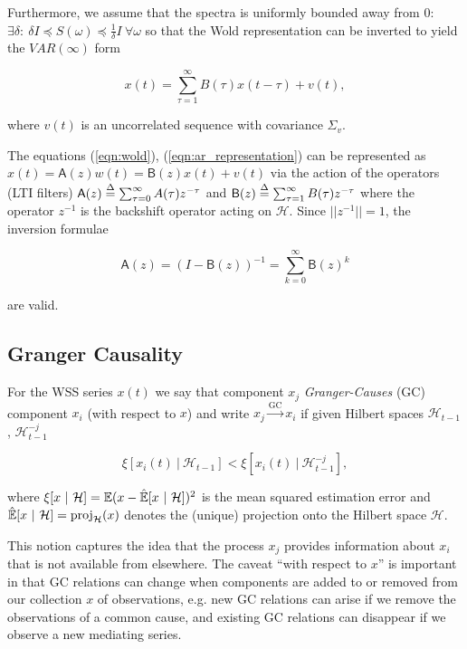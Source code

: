 \documentclass[12pt]{article}
\def\gc{\overset{\text{GC}}{\rightarrow}}  %
\def\B{\mathsf{B}}  %
\def\A{\mathsf{A}}  %
\def\H{\mathcal{H}}  %
\newcommand{\linE}[2]{\hat{\E}[#1\ |\ #2]}  %
\newcommand{\linEerr}[2]{\xi[#1\ |\ #2]}  %
\begin{document}
Furthermore, we assume that the spectra is uniformly bounded away from
$0$:
$\exists \delta:\ \delta I \preceq S(\omega) \preceq \frac{1}{\delta}
I\ \forall \omega$ so that the Wold representation can be inverted to
yield the $VAR(\infty)$ form

\begin{equation}
  \label{eqn:ar_representation}
  x(t) = \sum_{\tau = 1}^\infty B(\tau) x(t - \tau) + v(t),
\end{equation}

where $v(t)$ is an uncorrelated sequence with covariance $\Sigma_v$.

The equations (\ref{eqn:wold}), (\ref{eqn:ar_representation}) can be
represented as $x(t) = \A(z)w(t) = \B(z)x(t) + v(t)$ via the action of
the operators (LTI filters)
$\A(z) \defeq \sum_{\tau = 0}^\infty A(\tau)z^{-\tau}$ and
$\B(z) \defeq \sum_{\tau = 1}^\infty B(\tau)z^{-\tau}$ where the
operator $z^{-1}$ is the backshift operator acting on $\H$.  Since
$||z^{-1}|| = 1$, the inversion formulae

\begin{equation}
  \label{eqn:lsi_inversion}
  \A(z) = (I - \B(z))^{-1} = \sum_{k = 0}^\infty \B(z)^k
\end{equation}

are valid.
\subsection{Granger Causality}

\begin{definition}
  For the WSS series $x(t)$ we say that component $x_j$
  \textit{Granger-Causes} (GC) component $x_i$ (with respect to $x$)
  and write $x_j \gc x_i$ if given Hilbert spaces
  $\H_{t - 1}$, $\H^{-j}_{t - 1}$

\begin{equation}
  \linEerr{x_i(t)}{\H_{t - 1}} < \linEerr{x_i(t)}{\H^{-j}_{t - 1}},
\end{equation}

where $\xi[x \ |\ \H] = \E (x - \linE{x}{\H})^2$ is the mean squared
estimation error and $\linE{x}{\H} = \text{proj}_{\H}(x)$ denotes the
(unique) projection onto the Hilbert space $\H$.
\end{definition}

This notion captures the idea that the process $x_j$ provides
information about $x_i$ that is not available from elsewhere.  The
caveat ``with respect to $x$'' is important in that GC relations can
change when components are added to or removed from our collection $x$
of observations, e.g. new GC relations can arise if we remove the
observations of a common cause, and existing GC relations can
disappear if we observe a new mediating series.
\end{document}
